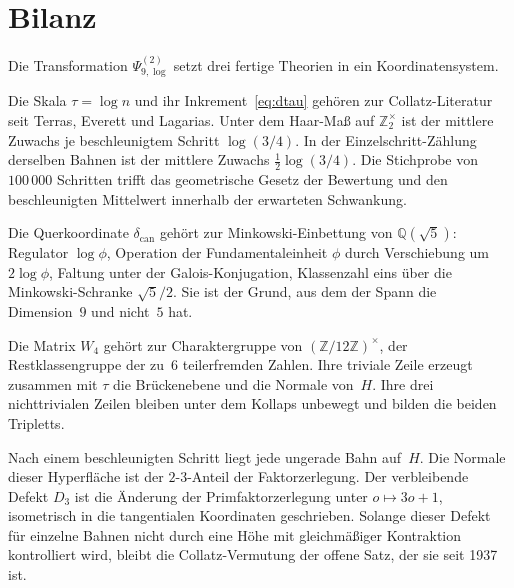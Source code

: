 \documentclass[11pt,a4paper]{article}
\theoremstyle{plain}
\theoremstyle{definition}
\newcommand{\Z}{\mathbb{Z}}
\newcommand{\Q}{\mathbb{Q}}
\numberwithin{equation}{section}
\begin{document}
\section{Bilanz}

Die Transformation $\Psi_{9,\log}^{(2)}$ setzt drei fertige Theorien in ein
Koordinatensystem.

Die Skala $\tau=\log n$ und ihr Inkrement~\eqref{eq:dtau} gehören zur
Collatz-Literatur seit Terras, Everett und Lagarias.
Unter dem Haar-Maß auf $\Z_2^\times$ ist der mittlere Zuwachs je beschleunigtem
Schritt $\log(3/4)$.
In der Einzelschritt-Zählung derselben Bahnen ist der mittlere Zuwachs
$\tfrac12\log(3/4)$.
Die Stichprobe von $100\,000$ Schritten trifft das geometrische Gesetz der
Bewertung und den beschleunigten Mittelwert innerhalb der erwarteten
Schwankung.

Die Querkoordinate $\delta_{\mathrm{can}}$ gehört zur Minkowski-Einbettung von
$\Q(\sqrt{5})$: Regulator $\log\phi$, Operation der Fundamentaleinheit $\phi$
durch Verschiebung um $2\log\phi$, Faltung unter der Galois-Konjugation,
Klassenzahl eins über die Minkowski-Schranke $\sqrt{5}/2$.
Sie ist der Grund, aus dem der Spann die Dimension~$9$ und nicht~$5$ hat.

Die Matrix $W_4$ gehört zur Charaktergruppe von $(\Z/12\Z)^\times$, der
Restklassengruppe der zu~$6$ teilerfremden Zahlen.
Ihre triviale Zeile erzeugt zusammen mit $\tau$ die Brückenebene und die
Normale von~$H$.
Ihre drei nichttrivialen Zeilen bleiben unter dem Kollaps unbewegt und
bilden die beiden Tripletts.

Nach einem beschleunigten Schritt liegt jede ungerade Bahn auf~$H$.
Die Normale dieser Hyperfläche ist der $2$-$3$-Anteil der Faktorzerlegung.
Der verbleibende Defekt $D_3$ ist die Änderung der Primfaktorzerlegung unter
$o\mapsto 3o+1$, isometrisch in die tangentialen Koordinaten geschrieben.
Solange dieser Defekt für einzelne Bahnen nicht durch eine Höhe mit
gleichmäßiger Kontraktion kontrolliert wird, bleibt die Collatz-Vermutung
der offene Satz, der sie seit 1937 ist.
\end{document}
